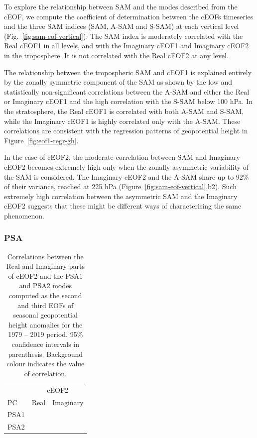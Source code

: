 \documentclass[smallextended]{svjour3}       %
\begin{document}
To explore the relationship between SAM and the modes described from the cEOF, we compute the coefficient of determination between the cEOFs timeseries and the three SAM indices (SAM, A-SAM and S-SAM) at each vertical level (Fig.~\ref{fig:sam-eof-vertical}).
The SAM index is moderately correlated with the Real cEOF1 in all levels, and with the Imaginary cEOF1 and Imaginary cEOF2 in the troposphere.
It is not correlated with the Real cEOF2 at any level.

The relationship between the tropospheric SAM and cEOF1 is explained entirely by the zonally symmetric component of the SAM as shown by the low and statistically non-significant correlations between the A-SAM and either the Real or Imaginary cEOF1 and the high correlation with the S-SAM below 100 hPa.
In the stratosphere, the Real cEOF1 is correlated with both A-SAM and S-SAM, while the Imaginary cEOF1 is highly correlated only with the A-SAM.
These correlations are consistent with the regression patterns of geopotential height in Figure~\ref{fig:eof1-regr-gh}.

In the case of cEOF2, the moderate correlation between SAM and Imaginary cEOF2 becomes extremely high only when the zonally asymmetric variability of the SAM is considered.
The Imaginary cEOF2 and the A-SAM share up to 92\% of their variance, reached at 225 hPa (Figure~\ref{fig:sam-eof-vertical}.b2).
Such extremely high correlation between the asymmetric SAM and the Imaginary cEOF2 suggests that these might be different ways of characterising the same phenomenon.

\hypertarget{psa}{%
\subsubsection{PSA}\label{psa}}




\begin{table}

\caption{\label{tab:psa-eof2}Correlations between the Real and Imaginary parts of cEOF2 and the PSA1 and PSA2 modes computed as the second and third EOFs of seasonal geopotential height anomalies \citep[following][]{mo2001} for the 1979 -- 2019 period. 95\% confidence intervals in parenthesis.
Background colour indicates the value of correlation.}
\centering
\begin{tabular}[t]{l>{}l>{}l}
\toprule
\multicolumn{1}{c}{} & \multicolumn{2}{c}{cEOF2} \\
\cmidrule(l{3pt}r{3pt}){2-3}
PC & Real & Imaginary\\
\midrule
PSA1 & \cellcolor[HTML]{C3BBDE}{\textcolor{black}{-0.32 (CI: -0.57 -- -0.01)}} & \cellcolor[HTML]{6058A9}{\textcolor{white}{-0.83 (CI: -0.9 -- -0.69)}}\\
PSA2 & \cellcolor[HTML]{645BAB}{\textcolor{white}{-0.81 (CI: -0.9 -- -0.67)}} & \cellcolor[HTML]{F9F1F0}{\textcolor{black}{0.059 (CI: -0.25 -- 0.36)}}\\
\bottomrule
\end{tabular}
\end{table}
\end{document}
